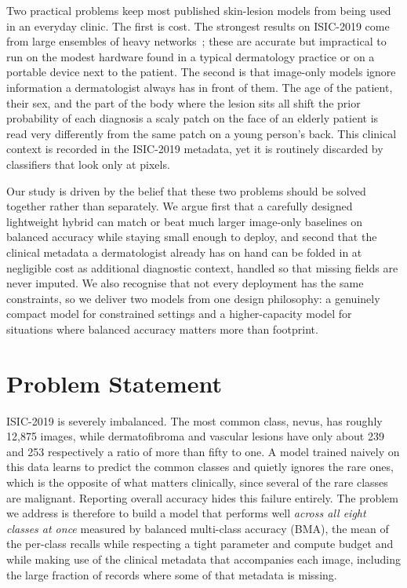 Two practical problems keep most published skin-lesion models from being used in
an everyday clinic. The first is cost. The strongest results on ISIC-2019 come
from large ensembles of heavy networks~\cite{isic2019leaderboard,gessert2020ensembles};
these are accurate but impractical to run on the modest hardware found in a
typical dermatology practice or on a portable device next to the patient. The
second is that image-only models ignore information a dermatologist always has
in front of them. The age of the patient, their sex, and the part of the body
where the lesion sits all shift the prior probability of each diagnosis a
scaly patch on the face of an elderly patient is read very differently from the
same patch on a young person's back. This clinical context is recorded in the
ISIC-2019 metadata, yet it is routinely discarded by classifiers that look only
at pixels.

Our study is driven by the belief that these two problems should be solved
together rather than separately. We argue first that a carefully designed
lightweight hybrid can match or beat much larger image-only baselines on
balanced accuracy while staying small enough to deploy, and second that the
clinical metadata a dermatologist already has on hand can be folded in at
negligible cost as additional diagnostic context, handled so that missing
fields are never imputed. We
also recognise that not every deployment has the same constraints, so we deliver
two models from one design philosophy: a genuinely compact model for
constrained settings and a higher-capacity model for situations where balanced
accuracy matters more than footprint.

\section{Problem Statement}

ISIC-2019 is severely imbalanced. The most common class, nevus, has roughly
12{,}875 images, while dermatofibroma and vascular lesions have only about 239
and 253 respectively a ratio of more than fifty to one. A model trained
naively on this data learns to predict the common classes and quietly ignores
the rare ones, which is the opposite of what matters clinically, since several
of the rare classes are malignant. Reporting overall accuracy hides this failure
entirely. The problem we address is therefore to build a model that performs
well \emph{across all eight classes at once} measured by balanced
multi-class accuracy (BMA), the mean of the per-class recalls while
respecting a tight parameter and compute budget and while making use of the
clinical metadata that accompanies each image, including the large fraction of
records where some of that metadata is missing.

